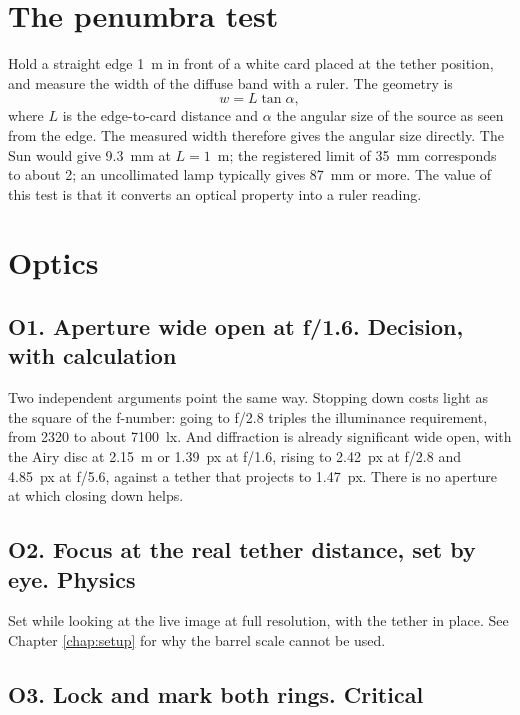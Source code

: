\section{The penumbra test}
\label{sec:penumbra}

Hold a straight edge 1~m in front of a white card placed at the tether
position, and measure the width of the diffuse band with a ruler. The geometry
is
\begin{equation}
w = L \tan \alpha ,
\label{eq:penumbra}
\end{equation}
where $L$ is the edge-to-card distance and $\alpha$ the angular size of the
source as seen from the edge. The measured width therefore gives the angular
size directly. The Sun would give 9.3~mm at $L = 1$~m; the registered limit of
35~mm corresponds to about 2\textdegree; an uncollimated lamp typically gives
87~mm or more. The value of this test is that it converts an optical property
into a ruler reading.

\section{Optics}

\subsection*{O1. Aperture wide open at f/1.6. \textnormal{Decision, with
calculation}}

Two independent arguments point the same way. Stopping down costs light as
the square of the f-number: going to f/2.8 triples the illuminance
requirement, from 2320 to about 7100~lx. And diffraction is already
significant wide open, with the Airy disc at 2.15~\textmu m or 1.39~px at
f/1.6, rising to 2.42~px at f/2.8 and 4.85~px at f/5.6, against a tether that
projects to 1.47~px. There is no aperture at which closing down helps.

\subsection*{O2. Focus at the real tether distance, set by eye.
\textnormal{Physics}}

Set while looking at the live image at full resolution, with the tether in
place. See Chapter \ref{chap:setup} for why the barrel scale cannot be used.

\subsection*{O3. Lock and mark both rings. \textnormal{Critical}}

